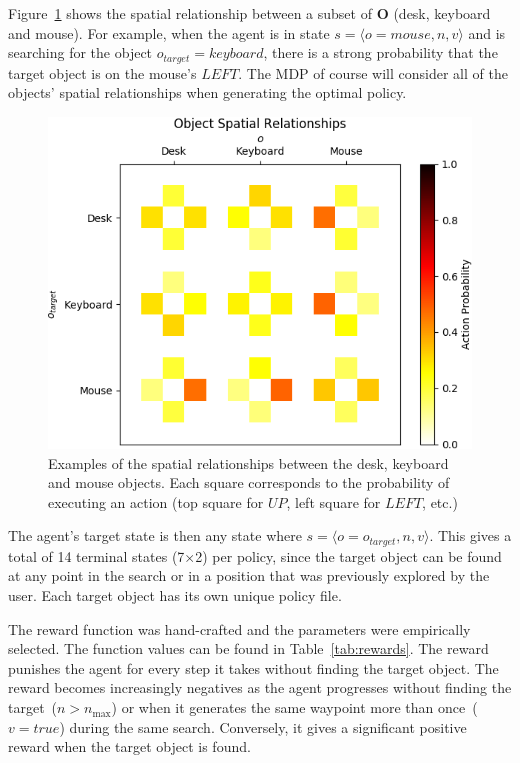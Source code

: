 \documentclass[a4paper, twoside]{article}
\begin{document}
Figure~\ref{fig:obj-relationships} shows the spatial relationship between a subset of $\mathbf{O}$ (desk, keyboard and mouse). For example, when the agent is in state ${s=\langle o=mouse, n, v \rangle}$ and is searching for the object $o_{target} = keyboard$, there is a strong probability that the target object is on the mouse's $LEFT$. The MDP of course will consider all of the objects' spatial relationships when generating the optimal policy.

\begin{figure}
  \centering
  \includegraphics[width=\columnwidth]{figures/object_relationships.png}
  \caption{Examples of the spatial relationships between the desk, keyboard and mouse objects. Each square corresponds to the probability of executing an action (top square for $UP$, left square for $LEFT$, etc.)}\label{fig:obj-relationships}
\end{figure}

The agent's target state is then any state where ${s = \langle o=o_{target}, n, v \rangle}$. This gives a total of 14 terminal states (7$\times$2) per policy, since the target object can be found at any point in the search or in a position that was previously explored by the user. Each target object has its own unique policy file.

The reward function was hand-crafted and the parameters were empirically selected. The function values can be found in Table~\ref{tab:rewards}. The reward punishes the agent for every step it takes without finding the target object. The reward becomes increasingly negatives as the agent progresses without finding the target~($n > n_{\max}$) or when it generates the same waypoint more than once~($v = true$) during the same search. Conversely, it gives a significant positive reward when the target object is found. 
\end{document}
